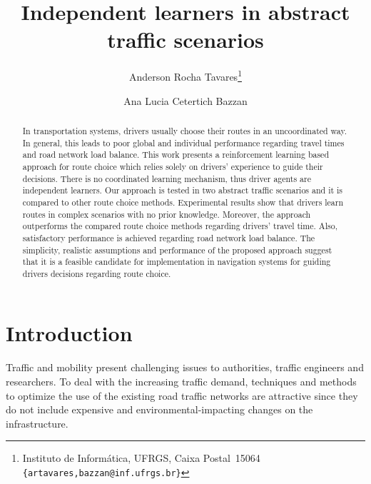 \documentclass{RITA}
\title{Independent learners in abstract traffic scenarios}
\author{
  Anderson Rocha Tavares\footnote{Instituto de Inform\'atica, UFRGS, Caixa Postal~15064\\
  \texttt{\{artavares,bazzan@inf.ufrgs.br\}}}
  \and Ana Lucia Cetertich Bazzan\footnotemark[1]
}
\begin{document}
\maketitle

\begin{abstract}
In transportation systems, drivers usually choose their routes in an uncoordinated way. In general, this leads to poor global and individual performance regarding travel times and road network load balance. This work presents a reinforcement learning based approach for route choice which relies solely on drivers' experience to guide their decisions. 
There is no coordinated learning mechanism, thus driver agents are independent learners. Our approach is tested in two abstract traffic scenarios and it is compared to other route choice methods. 
Experimental results show that drivers learn routes in complex scenarios with no prior knowledge. Moreover, the approach outperforms the compared route choice methods regarding drivers' travel time. Also, satisfactory performance is achieved regarding road network load balance. 
The simplicity, realistic assumptions and performance of the proposed approach suggest that it is a feasible candidate for implementation in navigation systems for guiding drivers decisions regarding route choice.
\end{abstract}




\section{Introduction}
\label{sec:intro}

Traffic and mobility present challenging issues to authorities, traffic engineers and researchers. To deal with the increasing traffic demand, techniques and methods to optimize the use of the existing road traffic networks are attractive since they do not include expensive and environmental-impacting changes on the infrastructure.
\end{document}
